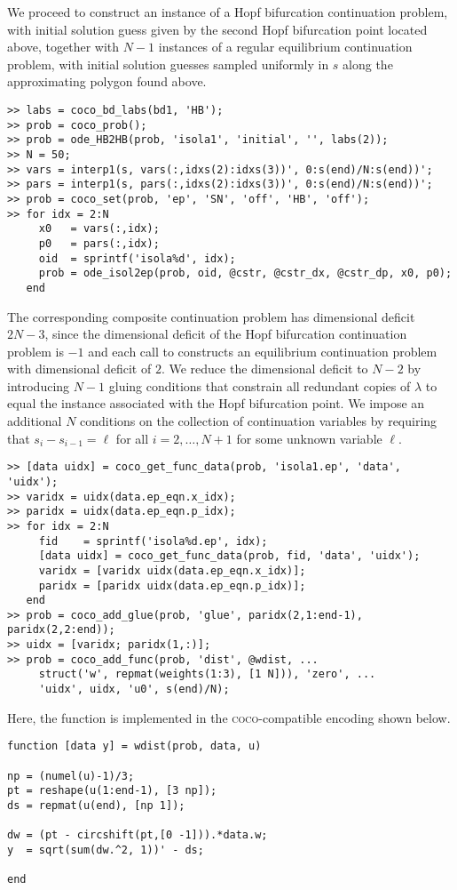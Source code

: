 We proceed to construct an instance of a Hopf bifurcation continuation problem, with initial solution guess given by the second Hopf bifurcation point located above, together with $N-1$ instances of a regular equilibrium continuation problem, with initial solution guesses sampled uniformly in $s$ along the approximating polygon found above.
\begin{lstlisting}[language=coco-highlight]
>> labs = coco_bd_labs(bd1, 'HB');
>> prob = coco_prob();
>> prob = ode_HB2HB(prob, 'isola1', 'initial', '', labs(2));
>> N = 50;
>> vars = interp1(s, vars(:,idxs(2):idxs(3))', 0:s(end)/N:s(end))';
>> pars = interp1(s, pars(:,idxs(2):idxs(3))', 0:s(end)/N:s(end))';
>> prob = coco_set(prob, 'ep', 'SN', 'off', 'HB', 'off');
>> for idx = 2:N
     x0   = vars(:,idx);
     p0   = pars(:,idx);
     oid  = sprintf('isola%d', idx);
     prob = ode_isol2ep(prob, oid, @cstr, @cstr_dx, @cstr_dp, x0, p0);
   end
\end{lstlisting}
The corresponding composite continuation problem has dimensional deficit $2N-3$, since the dimensional deficit of the Hopf bifurcation continuation problem is $-1$ and each call to  constructs an equilibrium continuation problem with dimensional deficit of $2$. We reduce the dimensional deficit to $N-2$ by introducing $N-1$ gluing conditions that constrain all redundant copies of $\lambda$ to equal the instance associated with the Hopf bifurcation point. We impose an additional $N$ conditions on the collection of continuation variables by requiring that $s_i-s_{i-1}=\ell$ for all $i=2,\ldots,N+1$ for some unknown variable $\ell$.
\begin{lstlisting}[language=coco-highlight]
>> [data uidx] = coco_get_func_data(prob, 'isola1.ep', 'data', 'uidx');
>> varidx = uidx(data.ep_eqn.x_idx);
>> paridx = uidx(data.ep_eqn.p_idx);
>> for idx = 2:N
     fid    = sprintf('isola%d.ep', idx);
     [data uidx] = coco_get_func_data(prob, fid, 'data', 'uidx');
     varidx = [varidx uidx(data.ep_eqn.x_idx)];
     paridx = [paridx uidx(data.ep_eqn.p_idx)];
   end
>> prob = coco_add_glue(prob, 'glue', paridx(2,1:end-1), paridx(2,2:end));
>> uidx = [varidx; paridx(1,:)];
>> prob = coco_add_func(prob, 'dist', @wdist, ...
     struct('w', repmat(weights(1:3), [1 N])), 'zero', ...
     'uidx', uidx, 'u0', s(end)/N);
\end{lstlisting}
Here, the function  is implemented in the \textsc{coco}-compatible encoding shown below.
\begin{lstlisting}[language=coco-highlight]
function [data y] = wdist(prob, data, u)

np = (numel(u)-1)/3;
pt = reshape(u(1:end-1), [3 np]);
ds = repmat(u(end), [np 1]);

dw = (pt - circshift(pt,[0 -1])).*data.w;
y  = sqrt(sum(dw.^2, 1))' - ds;

end
\end{lstlisting}
